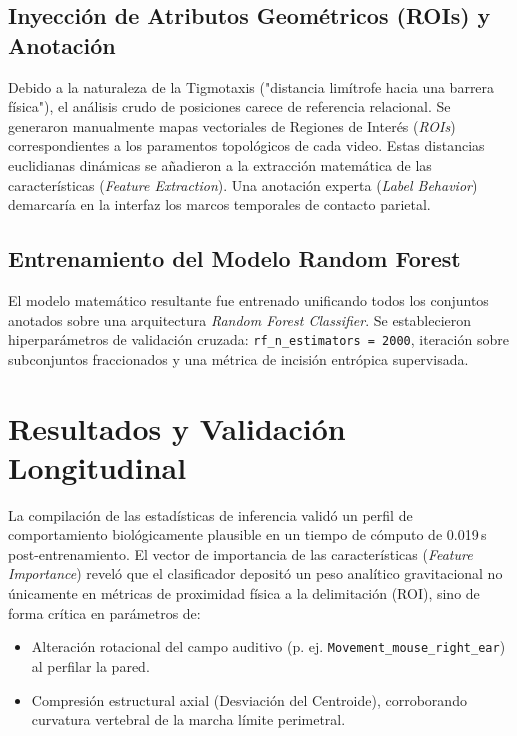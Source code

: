 \documentclass[12pt,a4paper]{article}
\begin{document}
\subsection{Inyección de Atributos Geométricos (ROIs) y Anotación}
Debido a la naturaleza de la Tigmotaxis ("distancia limítrofe hacia una barrera física"), el análisis crudo de posiciones carece de referencia relacional. Se generaron manualmente mapas vectoriales de Regiones de Interés (\textit{ROIs}) correspondientes a los paramentos topológicos de cada video. Estas distancias euclidianas dinámicas se añadieron a la extracción matemática de las características (\textit{Feature Extraction}). Una anotación experta (\textit{Label Behavior}) demarcaría en la interfaz los marcos temporales de contacto parietal.

\subsection{Entrenamiento del Modelo Random Forest}
El modelo matemático resultante fue entrenado unificando todos los conjuntos anotados sobre una arquitectura \textit{Random Forest Classifier}. Se establecieron hiperparámetros de validación cruzada: \texttt{rf\_n\_estimators = 2000}, iteración sobre subconjuntos fraccionados y una métrica de incisión entrópica supervisada. 

\section{Resultados y Validación Longitudinal}
La compilación de las estadísticas de inferencia validó un perfil de comportamiento biológicamente plausible en un tiempo de cómputo de 0.019\,s post-entrenamiento. 
El vector de importancia de las características (\textit{Feature Importance}) reveló que el clasificador depositó un peso analítico gravitacional no únicamente en métricas de proximidad física a la delimitación (ROI), sino de forma crítica en parámetros de:
\begin{itemize}
    \item Alteración rotacional del campo auditivo (p. ej. \texttt{Movement\_mouse\_right\_ear}) al perfilar la pared.
    \item Compresión estructural axial (Desviación del Centroide), corroborando curvatura vertebral de la marcha límite perimetral.
\end{itemize}
\end{document}
